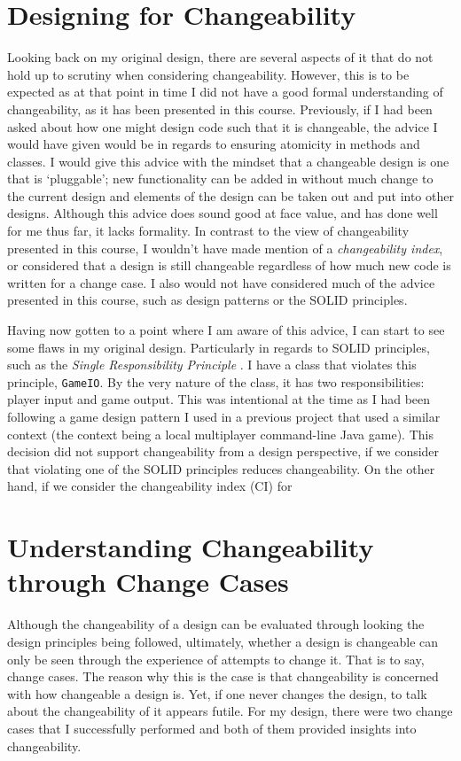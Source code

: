 \documentclass[10pt, a4paper, conference]{IEEEtran}
\begin{document}
\section{Designing for Changeability}
Looking back on my original design, there are several aspects of it that do not
hold up to scrutiny when considering changeability. However, this is to be
expected as at that point in time I did not have a good formal understanding of
changeability, as it has been presented in this course. Previously, if I had
been asked about how one might design code such that it is changeable, the
advice I would have given would be in regards to ensuring atomicity in methods
and classes. I would give this advice with the mindset that a changeable design
is one that is `pluggable'; new functionality can be added in without much
change to the current design and elements of the design can be taken out and
put into other designs. Although this advice does sound good at face value, and
has done well for me thus far, it lacks formality. In contrast to the view of
changeability presented in this course, I wouldn't have made mention of
a \textit{changeability index}, or considered that a design is still
changeable regardless of how much new code is written for a change case. I also
would not have considered much of the advice presented in this course, such as
design patterns or the SOLID principles.

Having now gotten to a point where I am aware of this advice, I can start to
see some flaws in my original design. Particularly in regards to SOLID
principles, such as the \textit{Single Responsibility Principle}
\cite{lec07-solid}. I have a class that violates this principle,
\texttt{GameIO}. By the very nature of the class, it has two responsibilities:
player input and game output. This was intentional at the time as I had been
following a game design pattern I used in a previous project that used
a similar context (the context being a local multiplayer command-line Java game).
This decision did not support changeability from a design perspective, if we
consider that violating one of the SOLID principles reduces changeability. On
the other hand, if we consider the changeability index (CI)
\cite{lec01b-changeability} for 

\section{Understanding Changeability through Change Cases}
Although the changeability of a design can be evaluated through looking the
design principles being followed, ultimately, whether a design is changeable
can only be seen through the experience of attempts to change it. That is to
say, change cases. The reason why this is the case is that changeability is
concerned with how changeable a design is. Yet, if one never changes the
design, to talk about the changeability of it appears futile. For my design, 
there were two change cases that I successfully performed and both of them 
provided insights into changeability.
\end{document}
